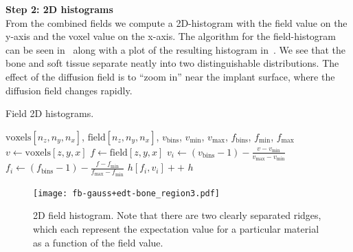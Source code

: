 \documentclass[pdflatex,sn-mathphys]{sn-jnl}%
\theoremstyle{thmstyleone}%
\theoremstyle{thmstyletwo}%
\theoremstyle{thmstylethree}%
\begin{document}
\vspace{\baselineskip}
\noindent\textbf{Step 2: 2D histograms} \\
From the combined fields we compute a 2D-histogram with the field value on the y-axis and the voxel
value on the x-axis.  The algorithm for the field-histogram can be seen in~
along with a plot of the resulting histogram in~. We see that the bone and soft tissue
separate neatly into two distinguishable distributions. The effect of the diffusion field is to ``zoom in'' near the implant surface,
where the diffusion field changes rapidly.


\begin{algorithm}
    \caption{Field 2D histograms.}
    \label{alg:field-hist}
    \begin{algorithmic}
         {$\text{voxels}[n_z,n_y,n_x]$, $\text{field}[n_z,n_y,n_x]$, $v_\text{bins}$, $v_
        \text{min}$, $v_\text{max}$, $f_\text{bins}$, $f_\text{min}$, $f_\text{max}$}
                \State $v \gets \text{voxels}[z,y,x]$
                    \State $f \gets \text{field}[z,y,x]$
                        \State $v_i \gets (v_\text{bins} - 1) - \frac{v - v_\text{min}}{v_\text{max} - v_\text{min}}$
                        \State $f_i \gets (f_\text{bins} - 1) - \frac{f - f_\text{min}}{f_\text{max} - f_\text{min}}$
                        \State $h[f_i,v_i]{+}{+}$
                    \EndIf
                \EndIf
            \EndFor
            \State \Return $h$
        \EndFunction
    \end{algorithmic}
\end{algorithm}

\begin{figure}
    \texttt{[image: fb-gauss+edt-bone\_region3.pdf]}
    \caption{2D field histogram. Note that there are two clearly separated ridges, which each represent
      the expectation value for a particular material as a function of the field value.}
    \label{fig:field-hist}
\end{figure}
\end{document}
